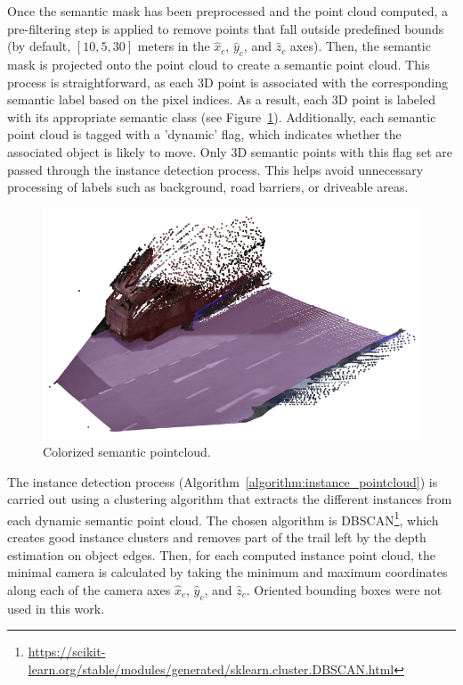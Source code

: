 Once the semantic mask has been preprocessed and the point cloud computed, a pre-filtering step is applied to remove points that fall outside predefined bounds (by default, $\left[10, 5, 30\right]$ meters in the $\hat{x}_c$, $\hat{y}_c$, and $\hat{z}_c$ axes). Then, the semantic mask is projected onto the point cloud to create a semantic point cloud. This process is straightforward, as each 3D point is associated with the corresponding semantic label based on the pixel indices. As a result, each 3D point is labeled with its appropriate semantic class (see Figure~\ref{fig:semantic_pointcloud}). Additionally, each semantic point cloud is tagged with a 'dynamic' flag, which indicates whether the associated object is likely to move. Only 3D semantic points with this flag set are passed through the instance detection process. This helps avoid unnecessary processing of labels such as background, road barriers, or driveable areas.

\begin{figure}[h!]
    \centering
    \includegraphics[width=0.7\linewidth]{images/methodology/pcd_semantic.png}
    \caption{Colorized semantic pointcloud.}
    \label{fig:semantic_pointcloud}
\end{figure}

The instance detection process (Algorithm~\ref{algorithm:instance_pointcloud}) is carried out using a clustering algorithm that extracts the different instances from each dynamic semantic point cloud. The chosen algorithm is DBSCAN\footnote{\url{https://scikit-learn.org/stable/modules/generated/sklearn.cluster.DBSCAN.html}}, which creates good instance clusters and removes part of the trail left by the depth estimation on object edges. Then, for each computed instance point cloud, the minimal camera  is calculated by taking the minimum and maximum coordinates along each of the camera axes $\hat{x}_c$, $\hat{y}_c$, and $\hat{z}_c$. Oriented bounding boxes were not used in this work.

